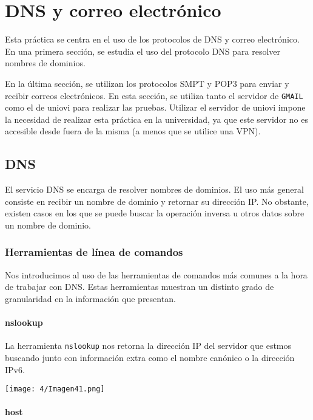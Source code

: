 \chapter{DNS y correo electrónico}\label{chap:4}
Esta práctica se centra en el uso de los protocolos de DNS y correo electrónico.
En una primera sección, se estudia el uso del protocolo DNS para resolver nombres de dominios.

En la última sección, se utilizan los protocolos SMPT y POP3 para enviar y recibir correos electrónicos.
En esta sección, se utiliza tanto el servidor de \verb#GMAIL# como el de uniovi para realizar las pruebas.
Utilizar el servidor de uniovi impone la necesidad de realizar esta práctica en la universidad,
ya que este servidor no es accesible desde fuera de la misma (a menos que se utilice una VPN).

\section{DNS}
El servicio DNS se encarga de resolver nombres de dominios.
El uso más general consiste en recibir un nombre de dominio y retornar su dirección IP{.}
No obstante, existen casos en los que se puede buscar la operación inversa u
otros datos sobre un nombre de dominio.

\subsection{Herramientas de línea de comandos}
Nos introducimos al uso de las herramientas de comandos más comunes a la hora de trabajar con DNS{.}
Estas herramientas muestran un distinto grado de granularidad en la información que presentan.

\subsubsection{nslookup}
La herramienta \verb#nslookup# nos retorna la dirección IP del servidor que estmos buscando
junto con información extra como el nombre canónico o la dirección IPv6.

\begin{minipage}{\linewidth}
	\centering
	\texttt{[image: 4/Imagen41.png]}
	\label{fig:4/1}
\end{minipage}

\subsubsection{host}

